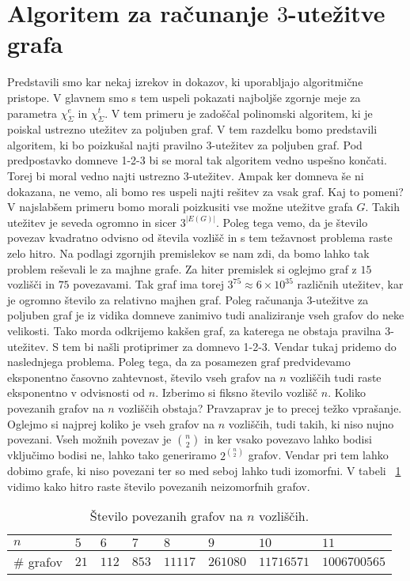 \documentclass[12pt,a4paper,twoside]{article}
\theoremstyle{definition} %
\theoremstyle{plain} %
\newcommand{\ec}{\chi_{\Sigma}^e}
\newcommand{\ect}{\chi_{\Sigma}^t}
\numberwithin{equation}{section}  %
\begin{document}
\section{Algoritem za računanje $3$-utežitve grafa}
Predstavili smo kar nekaj izrekov in dokazov, ki uporabljajo algoritmične pristope. V glavnem smo s tem uspeli pokazati najboljše zgornje meje za parametra $\ec$ in $\ect$. V tem primeru je zadoščal polinomski algoritem, ki je poiskal ustrezno utežitev za poljuben graf. V tem razdelku bomo predstavili algoritem, ki bo poizkušal najti pravilno $3$-utežitev za poljuben graf. Pod predpostavko domneve 1-2-3 bi se moral tak algoritem vedno uspešno končati. Torej bi moral vedno najti ustrezno $3$-utežitev. Ampak ker domneva še ni dokazana, ne vemo, ali bomo res uspeli najti rešitev za vsak graf. Kaj to pomeni? V najslabšem primeru bomo morali poizkusiti vse možne utežitve grafa $G$. Takih utežitev je seveda ogromno in sicer $3^{|E(G)|}$. Poleg tega vemo, da je število povezav kvadratno odvisno od števila vozlišč in s tem težavnost problema raste zelo hitro. Na podlagi zgornjih premislekov se nam zdi, da bomo lahko tak problem reševali le za majhne grafe. Za hiter premislek si oglejmo graf z $15$ vozlišči in $75$ povezavami. Tak graf ima torej $3^{75} \approx 6 \times 10^{35}$ različnih utežitev, kar je ogromno število za relativno majhen graf. Poleg računanja $3$-utežitve za poljuben graf je iz vidika domneve zanimivo tudi analiziranje vseh grafov do neke velikosti. Tako morda odkrijemo kakšen graf, za katerega ne obstaja pravilna $3$-utežitev. S tem bi našli protiprimer za domnevo 1-2-3. Vendar tukaj pridemo do naslednjega problema. Poleg tega, da za posamezen graf predvidevamo eksponentno časovno zahtevnost, število vseh grafov na $n$ vozliščih tudi raste eksponentno v odvisnosti od $n$. Izberimo si fiksno število vozlišč $n$. Koliko povezanih grafov na $n$ vozliščih obstaja? Pravzaprav je to precej težko vprašanje. Oglejmo si najprej koliko je vseh grafov na $n$ vozliščih, tudi takih, ki niso nujno povezani. Vseh možnih povezav je $ {n \choose 2}$ in ker vsako povezavo lahko bodisi vključimo bodisi ne, lahko tako generiramo $2^{n \choose 2}$ grafov. Vendar pri tem lahko dobimo grafe, ki niso povezani ter so med seboj lahko tudi izomorfni. V tabeli ~\ref{tbl:gnumb} vidimo kako hitro raste število povezanih neizomorfnih grafov.
\begin{table}[h!]


\begin{tabular}{|l|l|l|l|l|l|l|l|}

\hline
\multicolumn{1}{|l|}{$n$} & $5$  & $6$   & $7$ & $8$ & $9$ & $10$ & $11$ \\ \hline
\# grafov                 & $21$ & $112$ & $853$  & $11117$  & $261080$  & $11716571$   & $1006700565$  \\ \hline
\end{tabular}
\caption{Število povezanih grafov na $n$ vozliščih.}
\label{tbl:gnumb}
\end{table}
\end{document}
